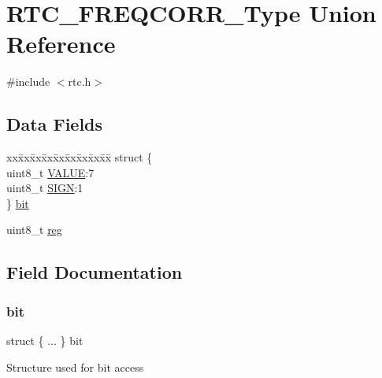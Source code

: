 \hypertarget{union_r_t_c___f_r_e_q_c_o_r_r___type}{}\section{R\+T\+C\+\_\+\+F\+R\+E\+Q\+C\+O\+R\+R\+\_\+\+Type Union Reference}
\label{union_r_t_c___f_r_e_q_c_o_r_r___type}


{\ttfamily \#include $<$rtc.\+h$>$}

\subsection*{Data Fields}
\begin{DoxyCompactItemize}
\item 
\begin{tabbing}
xx\=xx\=xx\=xx\=xx\=xx\=xx\=xx\=xx\=\kill
struct \{\\
\>uint8\_t \mbox{\hyperlink{union_r_t_c___f_r_e_q_c_o_r_r___type_a9b29f156e0b21de552a157a1248ee48e}{VALUE}}:7\\
\>uint8\_t \mbox{\hyperlink{union_r_t_c___f_r_e_q_c_o_r_r___type_a30425cd38d0d67a5052dc21383692fe4}{SIGN}}:1\\
\} \mbox{\hyperlink{union_r_t_c___f_r_e_q_c_o_r_r___type_a98607a3d130f9346fa219589c93f7344}{bit}}\\

\end{tabbing}\item 
uint8\+\_\+t \mbox{\hyperlink{union_r_t_c___f_r_e_q_c_o_r_r___type_a9428adc9af4653a2050e2536b55dec8d}{reg}}
\end{DoxyCompactItemize}


\subsection{Field Documentation}
\mbox{\label{union_r_t_c___f_r_e_q_c_o_r_r___type_a98607a3d130f9346fa219589c93f7344}} 
\subsubsection{\texorpdfstring{bit}{bit}}
{\footnotesize\ttfamily struct \{ ... \}   bit}

Structure used for bit access \mbox{\label{union_r_t_c___f_r_e_q_c_o_r_r___type_a9428adc9af4653a2050e2536b55dec8d}} 
